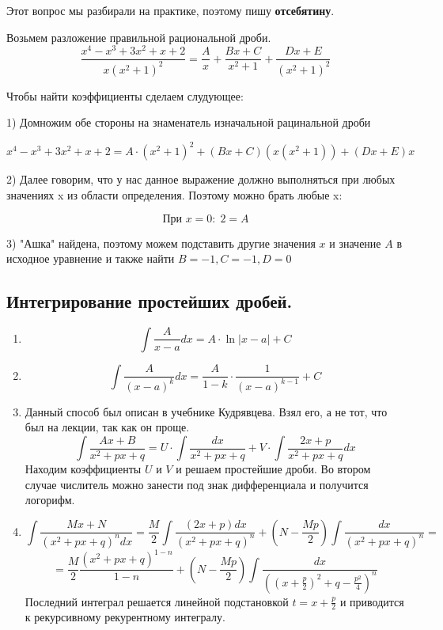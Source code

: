 \documentclass[a4paper,12pt]{article}
\theoremstyle{plain} %
\theoremstyle{definition} %
\theoremstyle{remark} %
\begin{document}
Этот вопрос мы разбирали на практике, поэтому пишу \textbf{отсебятину}.

Возьмем разложение правильной рациональной дроби.
\[
	\frac{x^4 - x^3 + 3x^2 + x + 2}{x(x^2 + 1)^2} = \frac{A}{x} + \frac{Bx + C}{x^2 + 1} + \frac{Dx + E}{(x^2 + 1)^2}
\]

Чтобы найти коэффициенты сделаем слудующее:

1) Домножим обе стороны на знаменатель изначальной рацинальной дроби

\[
	x^4 - x^3 + 3x^2 + x + 2 = A\cdot (x^2 + 1)^2 + (Bx + C)(x(x^2 + 1)) + (Dx + E)x
\]

2) Далее говорим, что у нас данное выражение должно выполняться при любых значениях x из области определения. Поэтому можно брать любые x:

\[
	\text{При } x = 0: \; 2 = A
\]

3) "Ашка" найдена, поэтому можем подставить другие значения $x$ и значение $A$ в исходное уравнение и также найти $B = -1, C = -1, D = 0$


\newpage
\subsection*{Интегрирование простейших дробей.} \label{easiest_ints}

\begin{enumerate}
	\item \[ \int \frac{A}{x - a}dx = A \cdot \ln|x - a| + C \]
	\item \[ \int \frac{A}{(x-a)^k}dx = \frac{A}{1 - k} \cdot \frac{1}{(x - a)^{k - 1}} + C \]
	\item Данный способ был описан в учебнике Кудрявцева. Взял его, а не тот, что был на лекции, так как он проще.
	      \[ \int \frac{Ax + B}{x^2 + px + q} = U \cdot \int \frac{dx}{x^2 + px + q} + V \cdot \int \frac{2x + p}{x^2 + px + q}dx \]
	      Находим коэффициенты $U$ и $V$ и решаем простейшие дроби. Во втором случае числитель можно занести под знак дифференциала и получится логорифм.
	\item \[ \int  \frac{Mx + N}{(x^2 + px + q)^n dx} = \frac{M}{2} \int \frac{(2x + p)dx}{(x^2 + px + q)^n} + \left( N - \frac{Mp}{2} \right) \int \frac{dx}{(x^2 + px + q)^n} =   \]
	      \[ = \frac{M}{2} \frac{(x^2 + px + q)^{1 - n}}{1 - n} + \left( N - \frac{Mp}{2} \right) \int \frac{dx}{\left( (x + \frac{p}{2})^2  + q - \frac{p^2}{4}\right)^n}  \]
	      Последний интеграл решается линейной подстановкой $t = x + \frac{p}{2}$ и приводится к рекурсивному рекурентному интегралу.
\end{enumerate}
\end{document}
